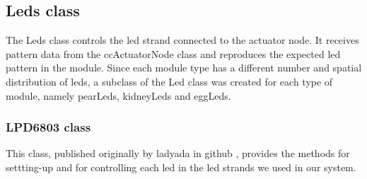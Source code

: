 \subsection{Leds class}	
The Leds class controls the led strand connected to the actuator node. It receives pattern data from the ccActuatorNode class and reproduces the expected led pattern in the module. Since each module type has a different number and spatial distribution of leds, a subclass of the Led class was created for each type of module, namely pearLeds, kidneyLeds and eggLeds. 

\subsubsection{LPD6803 class}	
This class, published originally by ladyada in github \cite{lady_ada_LPD6803}, provides the methods for settting-up and for controlling each led in the led strands we used in our system. 





